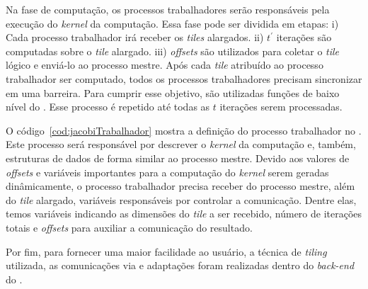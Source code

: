 Na fase de computação, os processos trabalhadores serão responsáveis pela
execução do \textit{kernel} da computação. Essa fase pode ser dividida em
etapas: i) Cada processo trabalhador irá receber os \textit{tiles} alargados.
ii) $t^\prime$ iterações são computadas sobre o \textit{tile} alargado. iii)
\textit{offsets} são utilizados para coletar o \textit{tile} lógico e enviá-lo
ao processo mestre. Após cada \textit{tile}
atribuído ao processo trabalhador ser computado, todos os processos
trabalhadores precisam sincronizar em uma barreira. Para cumprir esse objetivo,
são utilizadas funções de baixo nível do \mppa. Esse processo é repetido até
todas as $t$ iterações serem processadas.

O código~\ref{cod:jacobiTrabalhador} mostra a definição do processo trabalhador
no \mppa. Este processo será responsável por descrever o \textit{kernel} da
computação e, também, estruturas de dados de forma similar ao processo mestre.
Devido aos valores de \textit{offsets} e variáveis importantes para a computação
do \textit{kernel} serem geradas dinâmicamente, o processo trabalhador precisa
receber do processo mestre, além do \textit{tile} alargado, variáveis
responsáveis por controlar a comunicação. Dentre elas, temos variáveis indicando
as dimensões do \textit{tile} a ser recebido, número de iterações totais e
\textit{offsets} para auxiliar a comunicação do resultado.

Por fim, para fornecer uma maior facilidade ao usuário, a técnica de
\textit{tiling} utilizada, as comunicações via \noc e adaptações foram
realizadas dentro do \textit{back-end} do \pskel.
